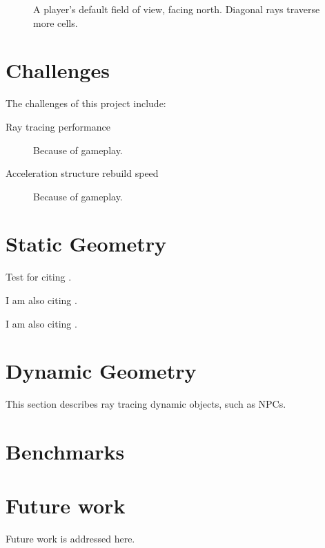 \documentclass[]{article}
\begin{document}
\begin{figure}
  \centering
  \caption{A player's default field of view, facing north. Diagonal rays traverse more cells.}
\end{figure}

\section{Challenges}
The challenges of this project include:
\begin{description}
  \item [Ray tracing performance] Because of gameplay.
  \item [Acceleration structure rebuild speed] Because of gameplay.
\end{description}

\section{Static Geometry}
Test for citing \cite{amanatides1987fast}.

I am also citing \cite{ivson2009gpu}.

I am also citing \cite{reinhard2000dynamic}.

\section{Dynamic Geometry}
This section describes ray tracing dynamic objects, such as NPCs.

\section{Benchmarks}


\section{Future work}
Future work is addressed here.

{}

\end{document}
